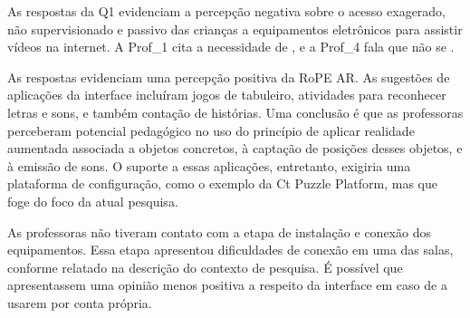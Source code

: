 

As respostas da Q1 evidenciam a percepção negativa sobre o acesso exagerado, não supervisionado e passivo das crianças a equipamentos eletrônicos para assistir vídeos na internet. A Prof\_1 cita a necessidade de , e a Prof\_4 fala que não se . 

As respostas evidenciam uma percepção positiva da RoPE AR. As sugestões de aplicações da interface incluíram jogos de tabuleiro, atividades para reconhecer letras e sons, e também contação de histórias. Uma conclusão é que as professoras perceberam potencial pedagógico no uso do princípio de aplicar realidade aumentada associada a objetos concretos, à captação de posições desses objetos, e à emissão de sons. O suporte a essas aplicações, entretanto, exigiria uma plataforma de configuração, como o exemplo da Ct Puzzle Platform, mas que foge do foco da atual pesquisa. 

As professoras não tiveram contato com a etapa de instalação e conexão dos equipamentos. Essa etapa apresentou dificuldades de conexão em uma das salas, conforme relatado na descrição do contexto de pesquisa. É possível que apresentassem uma opinião menos positiva a respeito da interface em caso de a usarem por conta própria.

